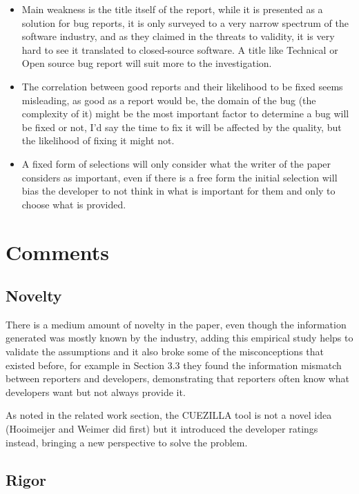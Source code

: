 \documentclass[11pt]{article}
\begin{document}
\begin{itemize}
  \item Main weakness is the title itself of the report, while it is presented as a solution for bug reports, it is only surveyed to a very narrow spectrum of the software industry, and as they claimed in the threats to validity, it is very hard to see it translated to closed-source software. A title like Technical or Open source bug report will suit more to the investigation.
  \item The correlation between good reports and their likelihood to be fixed seems misleading, as good as a report would be, the domain of the bug (the complexity of it) might be the most important factor to determine a bug will be fixed or not, I'd say the time to fix it will be affected by the quality, but the likelihood of fixing it might not.
  \item A fixed form of selections will only consider what the writer of the paper considers as important, even if there is a free form the initial selection will bias the developer to not think in what is important for them and only to choose what is provided.
\end{itemize}

\section{Comments}

\subsection{Novelty}

There is a medium amount of novelty in the paper, even though the information generated was mostly known by the industry, adding this empirical study helps to validate the assumptions and it also broke some of the misconceptions that existed before, for example in Section 3.3 they found the information mismatch between reporters and developers, demonstrating that reporters often know what developers want but not always provide it.

As noted in the related work section, the CUEZILLA tool is not a novel idea (Hooimeijer and Weimer did first) but it introduced the developer ratings instead, bringing a new perspective to solve the problem.

\subsection{Rigor}
\end{document}
